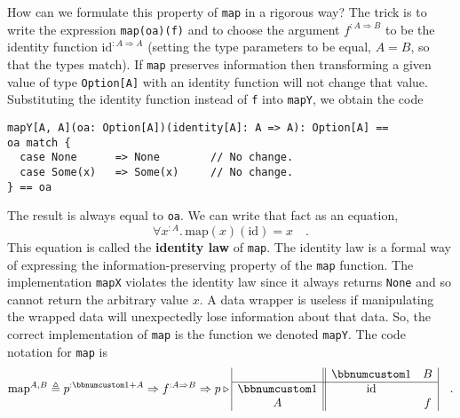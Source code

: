 How can we formulate this property of \lstinline!map! in a rigorous
way? The trick is to write the expression \lstinline!map(oa)(f)!
and to choose the argument $f^{:A\Rightarrow B}$ to be the identity
function $\text{id}^{:A\Rightarrow A}$ (setting the type parameters
to be equal, $A=B$, so that the types match). If \lstinline!map!
preserves information then transforming a given value of type \lstinline!Option[A]!
with an identity function will not change that value. Substituting
the identity function instead of \lstinline!f! into \lstinline!mapY!,
we obtain the code
\begin{lstlisting}
mapY[A, A](oa: Option[A])(identity[A]: A => A): Option[A] ==
oa match {
  case None      => None        // No change.
  case Some(x)   => Some(x)     // No change.
} == oa
\end{lstlisting}
The result is always equal to \lstinline!oa!. We can write that fact
as an equation,
\[
\forall x^{:A}.\,\text{map}(x)(\text{id})=x\quad.
\]
This equation is called the \textbf{identity law}
of \lstinline!map!. The identity law is a formal way of expressing
the information-preserving property of the \lstinline!map! function.
The implementation \lstinline!mapX! violates the identity law since
it always returns \lstinline!None! and so cannot return the arbitrary
value $x$. A data wrapper is useless if manipulating the wrapped
data will unexpectedly lose information about that data. So, the correct
implementation of \lstinline!map! is the function we denoted \lstinline!mapY!.
The code notation for \lstinline!map! is
\[
\text{map}^{A,B}\triangleq p^{:\bbnum 1+A}\Rightarrow f^{:A\Rightarrow B}\Rightarrow p\triangleright\begin{array}{|c||cc|}
 & \bbnum 1 & B\\
\hline \bbnum 1 & \text{id} & \\
A &  & f
\end{array}\quad.
\]

